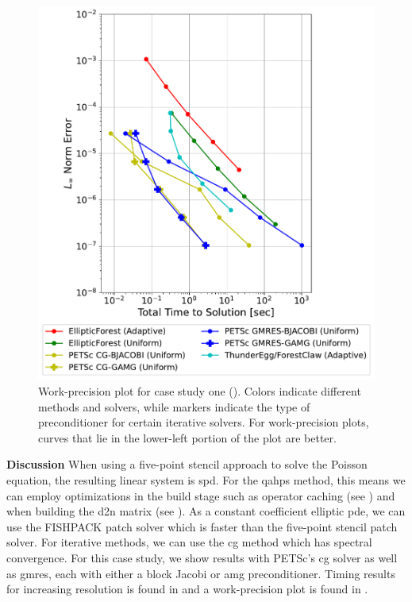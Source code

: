 \begin{figure}
    \centering
    \includegraphics[width=1.0\textwidth, clip=true, trim={0 0 0 0}]{figures/case01-work-precision-plots-no-title.pdf}
    \caption{Work-precision plot for case study one (). Colors indicate different methods and solvers, while markers indicate the type of preconditioner for certain iterative solvers. For work-precision plots, curves that lie in the lower-left portion of the plot are better.}
    \label{fig:case01-work-precision-plot}
\end{figure}

{\bf Discussion}
When using a five-point stencil approach to solve the Poisson equation, the resulting linear system is \gls{spd}. For the \gls{qahps} method, this means we can employ optimizations in the build stage such as operator caching (see ) and when building the \gls{d2n} matrix (see ). As a constant coefficient elliptic \gls{pde}, we can use the FISHPACK patch solver which is faster than the five-point stencil patch solver. For iterative methods, we can use the \gls{cg} method which has spectral convergence. For this case study, we show results with PETSc's \gls{cg} solver as well as \gls{gmres}, each with either a block Jacobi or \gls{amg} preconditioner. Timing results for increasing resolution is found in  and a work-precision plot is found in .

